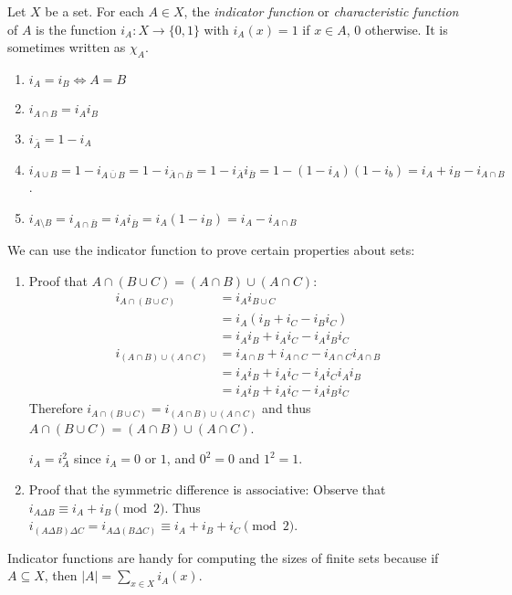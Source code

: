 \documentclass[a4paper]{article}
\begin{document}
  \begin{defi}
    Let $X$ be a set. For each $A\in X$, the \emph{indicator function} or \emph{characteristic function} of $A$ is the function $i_A: X\to \{0, 1\}$ with $i_A(x) = 1$ if $x\in A$, $0$ otherwise. It is sometimes written as $\chi_A$. 
  \end{defi}
  \begin{prop}\leavevmode
    \begin{enumerate}
      \item $i_A = i_B \Leftrightarrow A = B$
      \item $i_{A\cap B} = i_A i_B$
      \item $i_{\bar{A}} = 1 - i_A$
      \item $i_{A\cup B} = 1 - i_{\overline{A\cup B}}  = 1 - i_{\bar A\cap \bar B} = 1 - i_{\bar{A}}i_{\bar{B}} = 1 - (1 - i_A)(1 - i_b) = i_A + i_B - i_{A\cap B}$.
      \item $i_{A\setminus B} = i_{A\cap \bar B} = i_Ai_{\bar B} = i_A(1 - i_B) = i_A - i_{A\cap B}$
    \end{enumerate}
  \end{prop}

  \begin{eg}
    We can use the indicator function to prove certain properties about sets:
    \begin{enumerate}
      \item Proof that $A\cap(B\cup C) = (A\cap B)\cup (A\cap C)$:
        \begin{align*}
          i_{A\cap (B\cup C)} &= i_Ai_{B\cup C}\\
          &= i_A(i_B + i_C - i_Bi_C)\\
          &= i_Ai_B + i_Ai_C - i_Ai_Bi_C\\
          i_{(A\cap B)\cup (A\cap C)} &= i_{A\cap B} + i_{A\cap C} - i_{A\cap C}i_{A\cap B}\\
          &= i_Ai_B + i_Ai_C - i_Ai_Ci_Ai_B\\
          &= i_Ai_B + i_Ai_C - i_Ai_Bi_C
        \end{align*}
        Therefore $i_{A\cap (B\cup C)} = i_{(A\cap B)\cup (A\cap C)}$ and thus $A\cap(B\cup C) = (A\cap B)\cup (A\cap C)$.

        \note $i_A = i_A^2$ since $i_A = 0 $ or $1$, and $0^2 = 0$ and $1^2 = 1$.
      \item Proof that the symmetric difference is associative: Observe that $i_{A\Delta B} \equiv i_A + i_B \pmod 2$. Thus $i_{(A\Delta B)\Delta C} = i_{A\Delta(B\Delta C)} \equiv i_A + i_B + i_C \pmod2$.
    \end{enumerate}
  \end{eg}
  Indicator functions are handy for computing the sizes of finite sets because if $A\subseteq X$, then $|A| = \sum\limits_{x\in X}i_A(x)$.
\end{document}
